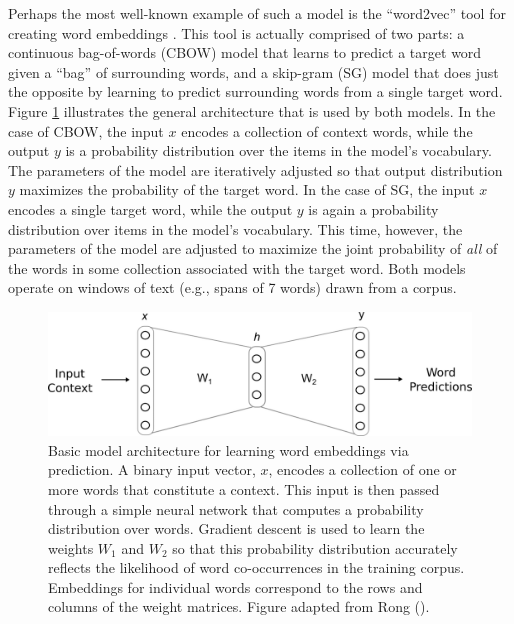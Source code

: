 Perhaps the most well-known example of such a model is the ``word2vec'' tool for creating word embeddings \citep{Mikolov:2013}. This tool is actually comprised of two parts: a continuous bag-of-words (CBOW) model that learns to predict a target word given a ``bag'' of surrounding words, and a skip-gram (SG) model that does just the opposite by learning to predict surrounding words from a single target word. Figure \ref{fig:w2v} illustrates the general architecture that is used by both models. In the case of CBOW, the input $x$ encodes a collection of context words, while the output $y$ is a probability distribution over the items in the model's vocabulary. The parameters of the model are iteratively adjusted so that output distribution $y$ maximizes the probability of the target word. In the case of SG, the input $x$ encodes a single target word, while the output $y$ is again a probability distribution over items in the model's vocabulary. This time, however, the parameters of the model are adjusted to maximize the joint probability of \textit{all} of the words in some collection associated with the target word. Both models operate on windows of text (e.g., spans of 7 words) drawn from a corpus.  

\begin{figure}
\centering
	\includegraphics[width=4.5in]{figures/word2vec.png}
	\caption{Basic model architecture for learning word embeddings via prediction. A binary input vector, $x$, encodes a collection of one or more words that constitute a context. This input is then passed through a simple neural network that computes a probability distribution over words. Gradient descent is used to learn the weights $W_1$ and $W_2$ so that this probability distribution accurately reflects the likelihood of word co-occurrences in the training corpus. Embeddings for individual words correspond to the rows and columns of the weight matrices. Figure adapted from Rong (\citeyear{Rong:2014}).}
    \label{fig:w2v}
\end{figure}

